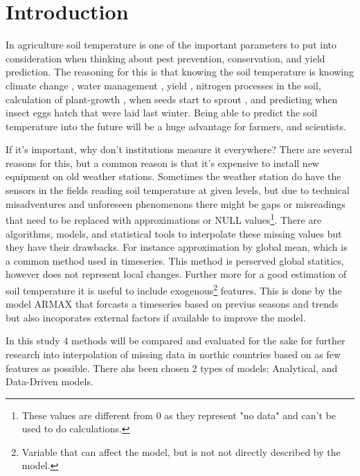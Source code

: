 \section{Introduction}

In agriculture soil temperature is one of the important parameters to put into consideration when thinking about pest prevention, conservation, and yield prediction. The reasoning for this is that knowing the soil temperature is knowing climate change \cite{li_attention-aware_2022}, water management \cite{alizamir_advanced_2020}, yield \cite{sim_prediction_2020}, nitrogen processes \cite{rankinen_simple_2004} in the soil, calculation of plant-growth \cite{li_modeling_2020}, when seeds start to sprout \cite{li_modeling_2020}, and predicting when insect eggs hatch that were laid last winter. Being able to predict the soil temperature into the future will be a huge advantage for farmers, and scientists.

If it's important, why don't institutions measure it everywhere? There are several reasons for this, but a common reason is that it's expensive to install new equipment on old weather stations. Sometimes the weather station do have the sensors in the fields reading soil temperature at given levels, but due to technical misadventures and unforeseen phenomenons there might be gaps or misreadings that need to be replaced with approximations or NULL values\footnote{These values are different from 0 as they represent "no data" and can't be used to do calculations.}. There are algorithms, models, and statistical tools to interpolate these missing values but they have their drawbacks. For instance approximation by global mean, which is a common method used in timeseries\cite{lepot_2017}. This method is perserved global statitics, however does not represent local changes. Further more for a good estimation of soil temperature it is useful to include exogenous\footnote{Variable that can affect the model, but is not not directly described by the model.} features. This is done by the model ARMAX that forcasts a timeseries based on previus seasons and trends but also incoporates external factors if available to improve the model. 

In this study 4 methods will be compared and evaluated for the sake for further research into interpolation of missing data in northic countries based on as few features as possible. There ahs been chosen 2 types of models; Analytical, and Data-Driven models. 